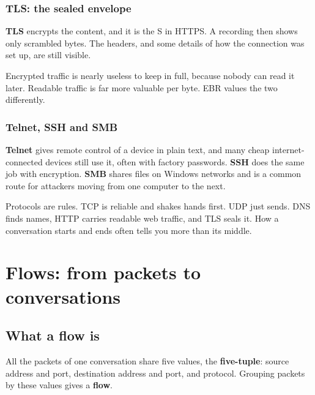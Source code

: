 \subsection{TLS: the sealed envelope}
\textbf{TLS} encrypts the content, and it is the S in HTTPS. A recording then shows only scrambled bytes. The headers, and some details of how the connection was set up, are still visible.

\begin{bigidea}
Encrypted traffic is nearly useless to keep in full, because nobody can read it later. Readable traffic is far more valuable per byte. EBR values the two differently.
\end{bigidea}

\subsection{Telnet, SSH and SMB}
\textbf{Telnet} gives remote control of a device in plain text, and many cheap internet-connected devices still use it, often with factory passwords. \textbf{SSH} does the same job with encryption. \textbf{SMB} shares files on Windows networks and is a common route for attackers moving from one computer to the next.

\begin{recap}
Protocols are rules. TCP is reliable and shakes hands first. UDP just sends. DNS finds names, HTTP carries readable web traffic, and TLS seals it. How a conversation starts and ends often tells you more than its middle.
\end{recap}

\chapter{Flows: from packets to conversations}
\label{ch:flows}

\section{What a flow is}
All the packets of one conversation share five values, the \textbf{five-tuple}: source address and port, destination address and port, and protocol. Grouping packets by these values gives a \textbf{flow}.

